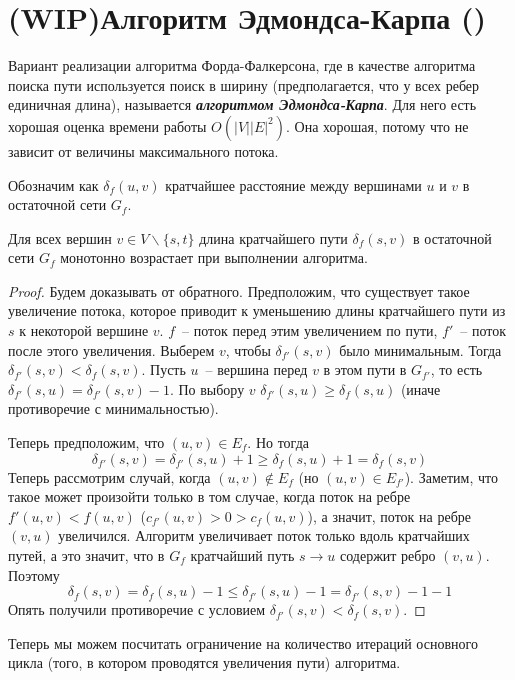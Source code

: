\let\bf\bfseries
\let\it\itshape
\section{(WIP)Алгоритм Эдмондса-Карпа (\groth)}\label{edmonds_karp}
Вариант реализации алгоритма Форда-Фалкерсона, где в качестве алгоритма поиска пути используется поиск в ширину (предполагается, что у всех ребер единичная длина), называется {\bf\it алгоритмом Эдмондса-Карпа}. Для него есть хорошая оценка времени работы $O(|V||E|^2)$. Она хорошая, потому что не зависит от величины максимального потока.

Обозначим как $\delta_f(u,v)$ кратчайшее расстояние между вершинами $u$ и $v$ в остаточной сети $G_f$.
\begin{lemma}\label{someshit5}
	Для всех вершин $v\in V\smallsetminus\{s,t\}$ длина кратчайшего пути $\delta_f(s,v)$ в остаточной сети $G_f$ монотонно возрастает при выполнении алгоритма.
\end{lemma}
\begin{proof}
	Будем доказывать от обратного. Предположим, что существует такое увеличение потока, которое приводит к уменьшению длины кратчайшего пути из $s$ к некоторой вершине $v$. $f$~-- поток перед этим увеличением по пути, $f'$~-- поток после этого увеличения. Выберем $v$, чтобы $\delta_{f'}(s,v)$ было минимальным. Тогда $\delta_{f'}(s,v)<\delta_f(s,v)$. Пусть $u$~-- вершина перед $v$ в этом пути в $G_{f'}$, то есть $\delta_{f'}(s,u)=\delta_{f'}(s,v)-1$. По выбору $v$ $\delta_{f'}(s,u)\ge\delta_f(s,u)$ (иначе противоречие с минимальностью). 
	
	Теперь предположим, что $(u,v)\in E_f$. Но тогда $$\delta_{f'}(s,v)=\delta_{f'}(s,u)+1\ge\delta_f(s,u)+1=\delta_f(s,v)$$
	Теперь рассмотрим случай, когда $(u,v)\not\in E_f$ (но $(u,v)\in E_{f'}$). Заметим, что такое может произойти только в том случае, когда поток на ребре $f'(u,v)<f(u,v)$ ($c_{f'}(u,v)>0>c_f(u,v)$), а значит, поток на ребре $(v,u)$ увеличился. Алгоритм увеличивает поток только вдоль кратчайших путей, а это значит, что в $G_f$ кратчайший путь $s\to u$ содержит ребро $(v,u)$. Поэтому $$\delta_f(s,v)=\delta_f(s,u)-1\le\delta_{f'}(s,u)-1=\delta_{f'}(s,v)-1-1$$
	Опять получили противоречие с условием $\delta_{f'}(s,v)<\delta_f(s,v)$.
\end{proof}

Теперь мы можем посчитать ограничение на количество итераций основного цикла (того, в котором проводятся увеличения пути) алгоритма.


